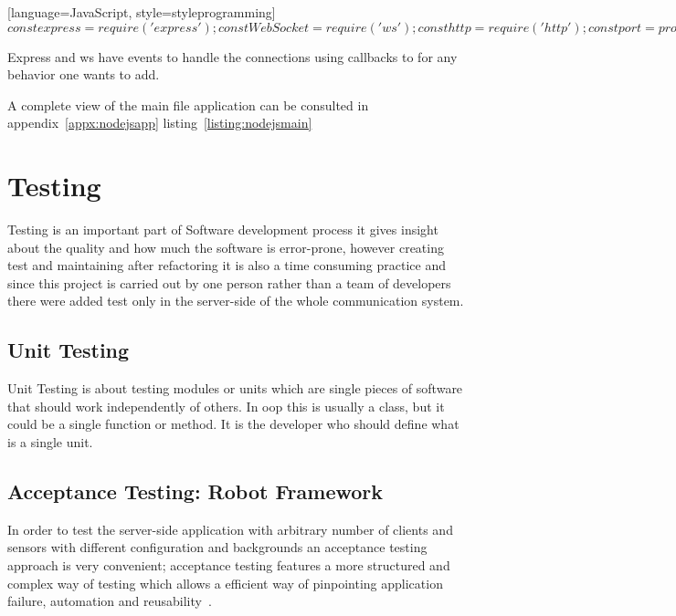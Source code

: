 \documentclass[hidelinks,11pt,a4paper,oneside,article]{memoir}
\begin{document}
[language=JavaScript, style=styleprogramming]$
const express = require('express');
const WebSocket = require('ws');
const http = require('http');

const port = process.env.PORT
const ip = '0.0.0.0';

/* http server */
const express = express();
const server = http.createServer(express);
    // ... handle http requests ...

/* websocket server extends the http server */
var wss = new WebSocket.Server({
    server: server,
    // other websocket configuration ...
});

 wss.on('connection', function connection(ws) {
    // ... handle websocket requests ...
});

server.listen(port, ip);
$

Express and ws have events to handle the connections using callbacks to for any behavior one wants to add.

A complete view of the main file application can be consulted in appendix~\ref{appx:nodejsapp} listing~\ref{listing:nodejsmain}



\section{Testing}
Testing is an important part of Software development process it gives insight about the quality and how much the software is error-prone, however creating test and maintaining after refactoring it is also a time consuming practice and since this project is carried out by one person rather than a team of developers there were added test only in the server-side of the whole communication system.

\subsection{Unit Testing}
Unit Testing is about testing modules or units which are single pieces of software that should work independently of others. In \gls{oop} this is usually a class, but it could be a single function or method. It is the developer who should define what is a single unit.
\subsection{Acceptance Testing: Robot Framework}
In order to test the server-side application with arbitrary number of clients and sensors with different configuration and backgrounds an acceptance testing approach is very convenient; acceptance testing features a more structured and complex way of testing which allows a efficient way of pinpointing application failure, automation and reusability~\cite{bisht2013robot}.
\end{document}
